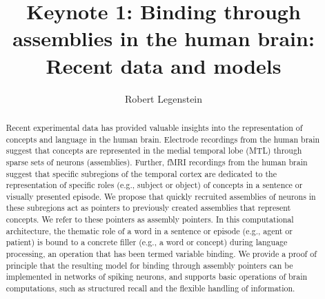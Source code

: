 \documentclass{article}
\title{Keynote 1: Binding through assemblies in the human brain: Recent data and models}
\author{Robert Legenstein}
\date{}
\begin{document}
\maketitle
\thispagestyle{empty}
\begin{abstract}
Recent experimental data has provided valuable insights into the representation of concepts and language in the human brain. Electrode recordings from the human brain suggest that concepts are represented in the medial temporal lobe (MTL) through sparse sets of neurons (assemblies). Further, fMRI recordings from the human brain suggest that specific subregions of the temporal cortex are dedicated to the representation of specific roles (e.g., subject or object) of concepts in a sentence or visually presented episode. We propose that quickly recruited assemblies of neurons in these subregions act as pointers  to previously created assemblies that represent concepts. We refer to these pointers as assembly pointers. In this computational architecture, the thematic role of a word in a sentence or episode (e.g., agent or patient) is bound to a concrete filler (e.g., a word or concept) during language processing, an operation that has been termed variable binding. We provide a proof of principle that the resulting model for binding through assembly pointers can be implemented in networks of spiking neurons, and supports basic operations of brain computations, such as structured recall and the flexible handling of information.
\end{abstract}
\end{document}
